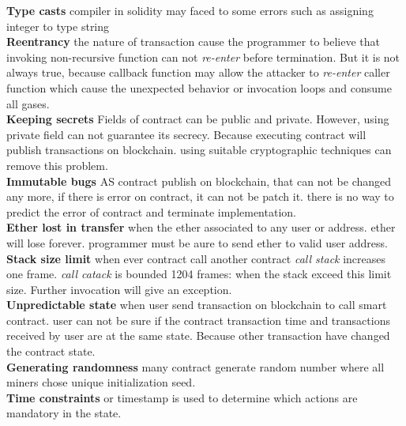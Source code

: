 \textbf{Type casts} compiler in solidity may faced to some errors such as assigning integer to type string\\
\textbf{Reentrancy} the nature of transaction cause the programmer to believe that invoking non-recursive function can not \textit{re-enter} before termination. But it is not always true, because callback function may allow the attacker to \textit{re-enter} caller function which cause the unexpected behavior or invocation loops and consume all gases.\\
\textbf{Keeping secrets} Fields of contract can be public and private. However, using private field can not guarantee its secrecy. Because executing contract will publish transactions on blockchain. using suitable cryptographic techniques can remove this problem.  \\
\textbf{Immutable bugs} AS contract publish on blockchain, that can not be changed any more, if there is error on contract, it can not be patch it. there is no way to predict the error of contract and terminate implementation. \\
\textbf{Ether lost in transfer} when the ether associated to any user or address.  ether will lose forever. programmer must be aure to send ether to valid user address. \\
\textbf{Stack size limit} when ever contract call another contract \textit{call stack} increases one frame. \textit{call catack} is bounded 1204 frames: when the stack exceed this limit size.  Further invocation will give an exception.\\
\textbf{Unpredictable state} when user send transaction on blockchain to call smart contract. user can not be sure if the contract transaction time and transactions received by user are at the same state. Because other transaction have changed the contract state. \\ 
\textbf{Generating randomness} many contract generate random number where all miners chose unique initialization seed.  \\
\textbf{Time constraints} or timestamp is used to determine which actions are mandatory in the state. \\

